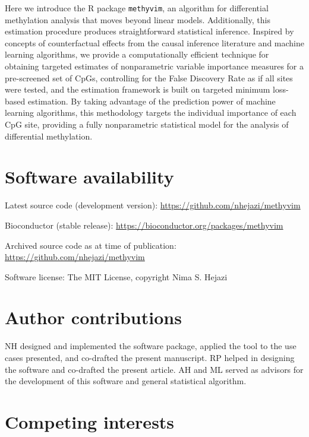 \documentclass[9pt,a4paper,]{extarticle}
\theoremstyle{definition}
\theoremstyle{definition}
\theoremstyle{definition}
\theoremstyle{remark}
\begin{document}
Here we introduce the R package \texttt{methyvim}, an algorithm for differential
methylation analysis that moves beyond linear models. Additionally, this
estimation procedure produces straightforward statistical inference. Inspired by
concepts of counterfactual effects from the causal inference literature and
machine learning algorithms, we provide a computationally efficient technique
for obtaining targeted estimates of nonparametric variable importance measures
for a pre-screened set of CpGs, controlling for the False Discovery Rate as if
all sites were tested, and the estimation framework is built on targeted
minimum loss-based estimation. By taking advantage of the prediction power of
machine learning algorithms, this methodology targets the individual importance
of each CpG site, providing a fully nonparametric statistical model for the
analysis of differential methylation.

\hypertarget{software-availability}{%
\section{Software availability}\label{software-availability}}

Latest source code (development version): \url{https://github.com/nhejazi/methyvim}

Bioconductor (stable release): \url{https://bioconductor.org/packages/methyvim}

Archived source code as at time of
publication: \url{https://github.com/nhejazi/methyvim}

Software license: The MIT License, copyright Nima S. Hejazi

\hypertarget{author-contributions}{%
\section{Author contributions}\label{author-contributions}}

NH designed and implemented the software package, applied the tool to the use
cases presented, and co-drafted the present manuscript. RP helped in designing
the software and co-drafted the present article. AH and ML served as advisors
for the development of this software and general statistical algorithm.

\hypertarget{competing-interests}{%
\section{Competing interests}\label{competing-interests}}
\end{document}
